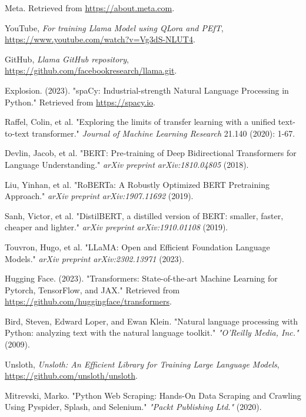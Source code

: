 \documentclass[conference]{IEEEtran}
\begin{document}
\begin{thebibliography}{1}
        Meta. Retrieved from \url{https://about.meta.com}.

        YouTube, \emph{For training Llama Model using QLora and PEfT}, \href{https://www.youtube.com/watch?v=Vg3dS-NLUT4}{https://www.youtube.com/watch?v=Vg3dS-NLUT4}.

        GitHub, \emph{Llama GitHub repository}, \href{https://github.com/facebookresearch/llama.git}{https://github.com/facebookresearch/llama.git}.

        Explosion. (2023). "spaCy: Industrial-strength Natural Language Processing in Python." Retrieved from \url{https://spacy.io}.

        Raffel, Colin, et al. "Exploring the limits of transfer learning with a unified text-to-text transformer." \emph{Journal of Machine Learning Research} 21.140 (2020): 1-67.

        Devlin, Jacob, et al. "BERT: Pre-training of Deep Bidirectional Transformers for Language Understanding." \emph{arXiv preprint arXiv:1810.04805} (2018).

        Liu, Yinhan, et al. "RoBERTa: A Robustly Optimized BERT Pretraining Approach." \emph{arXiv preprint arXiv:1907.11692} (2019).

        Sanh, Victor, et al. "DistilBERT, a distilled version of BERT: smaller, faster, cheaper and lighter." \emph{arXiv preprint arXiv:1910.01108} (2019).

        Touvron, Hugo, et al. "LLaMA: Open and Efficient Foundation Language Models." \emph{arXiv preprint arXiv:2302.13971} (2023).

        Hugging Face. (2023). "Transformers: State-of-the-art Machine Learning for Pytorch, TensorFlow, and JAX." Retrieved from \url{https://github.com/huggingface/transformers}.

        Bird, Steven, Edward Loper, and Ewan Klein. "Natural language processing with Python: analyzing text with the natural language toolkit." \emph{"O'Reilly Media, Inc."} (2009).

        Unsloth, \emph{Unsloth: An Efficient Library for Training Large Language Models}, \href{https://github.com/unsloth/unsloth}{https://github.com/unsloth/unsloth}.

        Mitrevski, Marko. "Python Web Scraping: Hands-On Data Scraping and Crawling Using Pyspider, Splash, and Selenium." \emph{"Packt Publishing Ltd."} (2020).


\end{thebibliography}
\end{document}
